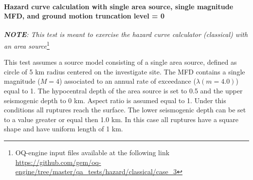 \paragraph{Hazard curve calculation with single area source, single
magnitude MFD, and ground motion truncation level = 0} 
%
\textit{\textbf{NOTE}: This test is meant to exercise the hazard curve 
    calculator (classical) with an area source}\footnote{
    OQ-engine input files available at the following link
    \url{https://github.com/gem/oq-engine/tree/master/qa_tests/hazard/classical/case_3}}
 
This test assumes a source model consisting of a single area source, 
defined as circle of 5 km radius centered on the investigate site. 
%
The MFD contains a single magnitude ($M=4$) associated to an annual rate of
exceedance ($\lambda(m=4.0)$) equal to 1. The hypocentral depth of the area
source is set to 0.5 and the upper seismogenic depth to 0 km. Aspect ratio is
assumed equal to 1. Under this conditions all ruptures reach the surface. The
lower seismogenic depth can be set to a value greater or equal then 1.0 km. In
this case all ruptures have a square shape and have uniform length of 1 km. 

